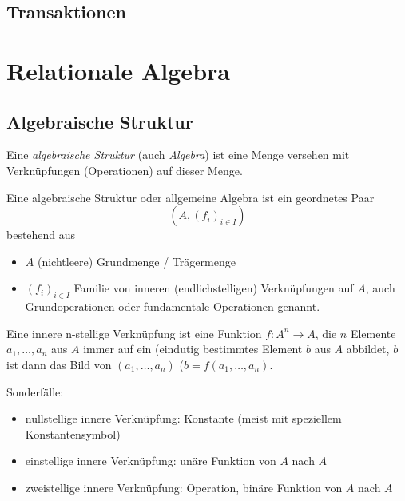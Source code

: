 \documentclass{scrbook}
\begin{document}
\section{Transaktionen}






\chapter{Relationale Algebra}

\section{Algebraische Struktur}
Eine \emph{algebraische Struktur} (auch \emph{Algebra}) ist eine Menge 
versehen mit Verknüpfungen (Operationen) auf dieser Menge.

\begin{definition}
Eine algebraische Struktur oder allgemeine Algebra ist ein geordnetes Paar
\begin{displaymath}
	(A,(f_i)_{i ∈ I})
\end{displaymath}
bestehend aus 
\begin{itemize}
\item $A$ (nichtleere) Grundmenge / Trägermenge
\item $(f_i)_{i ∈ I}$ Familie von inneren (endlichstelligen) Verknüpfungen auf $A$,
	auch Grundoperationen oder fundamentale Operationen genannt.
\end{itemize}
\end{definition}

\begin{definition}
Eine innere n-stellige Verknüpfung ist eine Funktion $f: A^n → A$,
die $n$ Elemente $a_1, \dots, a_n$ aus $A$ immer auf ein (eindutig bestimmtes
Element $b$ aus $A$ abbildet, $b$ ist dann das Bild von $(a_1, \dots, a_n)$ 
($b = f(a_1, \dots, a_n)$.
\end{definition}

\noindent
Sonderfälle:
\begin{itemize}
\item nullstellige innere Verknüpfung: Konstante (meist mit speziellem Konstantensymbol)
\item einstellige innere Verknüpfung: unäre Funktion von $A$ nach $A$
\item zweistellige innere Verknüpfung: Operation, binäre Funktion von $A$ nach $A$
\end{itemize}
\end{document}
